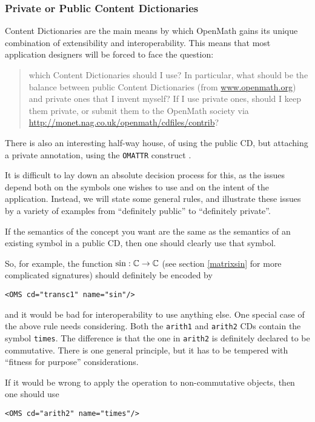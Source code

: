\documentclass[report,keylogo]{openmath}
\begin{document}
\subsubsection{Private or Public Content Dictionaries}
Content Dictionaries are the main means by which OpenMath gains its
unique combination of extensibility and interoperability. This means
that most application designers will be forced to face the question:
\begin{quote}
  which Content Dictionaries should I use? In particular, what should
  be the balance between public Content Dictionaries (from
  \url{www.openmath.org}) and private ones that I invent myself? If I
  use private ones, should I keep them private, or submit them to the
  OpenMath society via
  \url{http://monet.nag.co.uk/openmath/cdfiles/contrib}?
\end{quote}
There is also an interesting half-way house, of using the public CD,
but attaching a private annotation, using the {\tt OMATTR} construct
\cite{OMstd}.
\par
It is difficult to lay down an absolute decision process for this, as
the issues depend both on the symbols one wishes to use and on the
intent of the application.  Instead, we will state some general rules,
and illustrate these issues by a variety of examples from ``definitely
public'' to ``definitely private''.  
\begin{rule}
  If the semantics of the concept you want are the same as the
  semantics of an existing symbol in a public CD, then one should
  clearly use that symbol.
\end{rule}
So, for example, the function $\sin:\mathbb{C} \rightarrow\mathbb{C}$ (see section
\ref{matrixsin} for more complicated signatures) should definitely be
encoded by
\begin{verbatim}
<OMS cd="transc1" name="sin"/>
\end{verbatim}
and it would be bad for interoperability to use anything else.
\label{commutativity}
One special case of the above rule needs considering. Both the {\tt arith1}
and {\tt arith2} CDs contain the symbol {\tt times}. The difference is that
the one in {\tt arith2} is definitely declared to be commutative. There is
one general principle, but it has to be tempered with ``fitness for
purpose'' considerations.
\begin{rule}
If it would be wrong to apply the operation to non-commutative objects,
then one should use 
\begin{verbatim}
<OMS cd="arith2" name="times"/>
\end{verbatim}
\end{rule}
\end{document}
